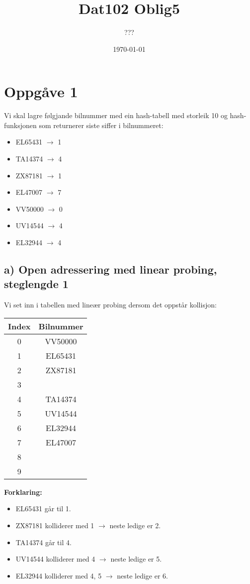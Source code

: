 \documentclass[12pt]{article}
\title{Dat102 Oblig5}
\author{???}
\date{\today}
\begin{document}
\maketitle

\section*{Oppgåve 1}

Vi skal lagre følgjande bilnummer med ein hash-tabell med storleik 10 og hash-funksjonen som returnerer siste siffer i bilnummeret:

\begin{itemize}
    \item EL65431 $\rightarrow$ 1
    \item TA14374 $\rightarrow$ 4
    \item ZX87181 $\rightarrow$ 1
    \item EL47007 $\rightarrow$ 7
    \item VV50000 $\rightarrow$ 0
    \item UV14544 $\rightarrow$ 4
    \item EL32944 $\rightarrow$ 4
\end{itemize}

\subsection*{a) Open adressering med linear probing, steglengde 1}

Vi set inn i tabellen med lineær probing dersom det oppstår kollisjon:

\begin{center}
\begin{tabular}{|c|c|}
\hline
Index & Bilnummer \\
\hline
0 & VV50000 \\
1 & EL65431 \\
2 & ZX87181 \\
3 & \\
4 & TA14374 \\
5 & UV14544 \\
6 & EL32944 \\
7 & EL47007 \\
8 & \\
9 & \\
\hline
\end{tabular}
\end{center}

\noindent 
\textbf{Forklaring:}
\begin{itemize}
    \item EL65431 går til 1.
    \item ZX87181 kolliderer med 1 $\rightarrow$ neste ledige er 2.
    \item TA14374 går til 4.
    \item UV14544 kolliderer med 4 $\rightarrow$ neste ledige er 5.
    \item EL32944 kolliderer med 4, 5 $\rightarrow$ neste ledige er 6.
\end{itemize}
\end{document}

